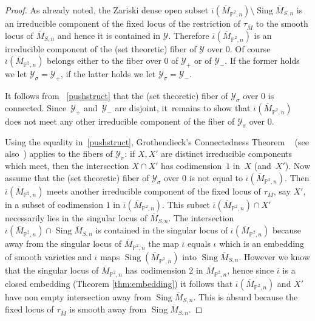 \documentclass[JEP,XML,SOM,Unicode,published]{cedram}
\newcommand{\PP}{{\mathbb P}}\let\P\PP
\newcommand\cY{\mathcal{Y}}
\DeclareMathOperator{\Sing}{Sing}
\let\ov\overline
\theoremstyle{definition}
\def\citestacks#1{\cite[\href{https://stacks.math.columbia.edu/tag/#1}{Tag #1}]{stacks-project}}
\begin{document}
\begin{proof}
As already noted, the Zariski dense open subset
$\ov{\iota}(\ov{M}_{\PP^2,n})\setminus\Sing\overline{M}_{S,n}$ is an irreducible component of the fixed locus of the restriction of $\tau_{\ov{M}}$ to the smooth locus of $\overline{M}_{S,n}$ and hence it is contained in $\cY$.
Therefore $\ov{\iota}(\ov{M}_{\PP^2,n})$ is an irreducible component of the (set theoretic) fiber of $\cY$ over $0$.
Of course $\ov{\iota}(\ov{M}_{\PP^2,n})$ belongs either to the fiber over $0$ of $\cY_{+}$ or of $\cY_{-}$.
If the former holds we let $\cY_{\sigma}=\cY_{+}$, if the latter holds we let $\cY_{\sigma}=\cY_{-}$.

It follows from ~\eqref{pushstruct} that the (set theoretic) fiber of $\cY_{\sigma}$ over $0$ is connected. Since~$\cY_{+}$ and~$\cY_{-}$ are disjoint, it~remains to show that $\ov{\iota}(\ov{M}_{\PP^2,n})$ does not meet any other irreducible component of the fiber of $\cY_{\sigma}$ over $0$.

Using the equality in~\eqref{pushstruct}, Grothendieck's Connectedness Theorem ~\cite[Th.\,7]{Faltings:Formal} (see also~\citestacks{0ECQ}) applies to the fibers of $\cY_{\sigma}$: if $X, X'$ are distinct irreducible components which meet, then the intersection $X\cap X'$ has codimension~$1$ in~$X$ (and~$X'$).
Now assume that the (set theoretic) fiber of $\cY_{\sigma}$ over $0$ is not equal to $\ov{\iota}(\ov{M}_{\PP^2,n})$.
Then $\ov{\iota}(\ov{M}_{\PP^2,n})$ meets another irreducible component of the fixed locus of $\tau_{\ov{M}}$, say $X'$, in a subset of codimension $1$ in $\ov{\iota}(\ov{M}_{\PP^2,n})$. This subset $\ov{\iota}(\ov{M}_{\PP^2,n})\cap X'$ necessarily lies in the singular locus of $\ov{M}_{S,n}$. The intersection $\ov{\iota}(\ov{M}_{\PP^2,n})\cap\Sing\overline{M}_{S,n}$ is contained in the singular locus of $\ov{\iota}(\ov{M}_{\PP^2,n})$ because away from the singular locus of $\ov{M}_{\PP^2,n}$ the map $\ov{\iota}$ equals $\iota$ which is an embedding of smooth varieties and $\ov{\iota}$ maps $\Sing(\ov{M}_{\PP^2,n})$ into $\Sing\overline{M}_{S,n}$. However we know that the singular locus of $\ov{M}_{\PP^2,n}$ has codimension $2$ in $\ov{M}_{\PP^2,n}$, hence since $\ov{\iota}$ is a closed embedding (Theorem \ref{thm:embedding}) it follows that $\ov{\iota}(\ov{M}_{\PP^2,n})$ and $X'$ have non empty intersection away from $\Sing\overline{M}_{S,n}$.
This is absurd because the fixed locus of $\tau_{\ov{M}}$ is smooth away from $\Sing\overline{M}_{S,n}$.
\end{proof}
\end{document}

